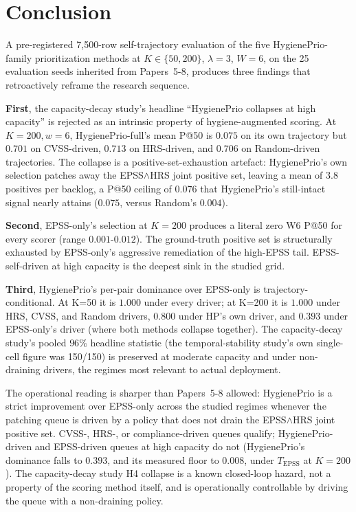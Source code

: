 \section{Conclusion}
\label{sec:conclusion}

A pre-registered 7{,}500-row self-trajectory evaluation of the five
HygienePrio-family prioritization methods at $K \in \{50, 200\}$,
$\lambda = 3$, $W = 6$, on the 25 evaluation seeds inherited from
Papers~5-8, produces three findings that retroactively reframe the
research sequence.

\textbf{First}, the capacity-decay study's headline ``HygienePrio collapses at high
capacity'' is rejected as an intrinsic property of hygiene-augmented
scoring. At $K = 200, w = 6$, HygienePrio-full's mean P@50 is $0.075$
on its own trajectory but $0.701$ on CVSS-driven, $0.713$ on
HRS-driven, and $0.706$ on Random-driven trajectories. The collapse
is a positive-set-exhaustion artefact: HygienePrio's own selection
patches away the EPSS$\wedge$HRS joint positive set, leaving a mean
of $3.8$ positives per backlog, a P@50 ceiling of $0.076$ that
HygienePrio's still-intact signal nearly attains ($0.075$, versus
Random's $0.004$).

\textbf{Second}, EPSS-only's selection at $K = 200$ produces a literal
zero W6 P@50 for every scorer (range $0.001$-$0.012$). The
ground-truth positive set is structurally exhausted by EPSS-only's
aggressive remediation of the high-EPSS tail. EPSS-self-driven at
high capacity is the deepest sink in the studied grid.

\textbf{Third}, HygienePrio's per-pair dominance over EPSS-only is
trajectory-conditional. At K=50 it is $1.000$ under every driver;
at K=200 it is $1.000$ under HRS, CVSS, and Random drivers, $0.800$
under HP's own driver, and $0.393$ under EPSS-only's driver
(where both methods collapse together). The capacity-decay study's pooled $96\%$
headline statistic (the temporal-stability study's own single-cell figure was 150/150) is
preserved at moderate capacity and under non-draining
drivers, the regimes most relevant to actual deployment.

The operational reading is sharper than Papers~5-8 allowed:
HygienePrio is a strict improvement over EPSS-only across the
studied regimes whenever the patching queue is driven by a policy
that does not drain the EPSS$\wedge$HRS joint positive set. CVSS-,
HRS-, or compliance-driven queues qualify; HygienePrio-driven and
EPSS-driven queues at high capacity do not (HygienePrio's dominance
falls to $0.393$, and its measured floor to $0.008$, under
$T_{\mathrm{EPSS}}$ at $K = 200$). The capacity-decay study H4 collapse is a known
closed-loop hazard, not a property of the scoring method itself, and
is operationally controllable by driving the queue with a
non-draining policy.

